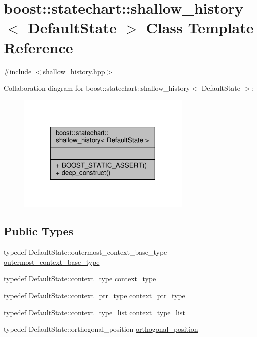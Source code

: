\hypertarget{classboost_1_1statechart_1_1shallow__history}{}\section{boost\+:\+:statechart\+:\+:shallow\+\_\+history$<$ Default\+State $>$ Class Template Reference}
\label{classboost_1_1statechart_1_1shallow__history}


{\ttfamily \#include $<$shallow\+\_\+history.\+hpp$>$}



Collaboration diagram for boost\+:\+:statechart\+:\+:shallow\+\_\+history$<$ Default\+State $>$\+:
\nopagebreak
\begin{figure}[H]
\begin{center}
\leavevmode
\includegraphics[width=237pt]{classboost_1_1statechart_1_1shallow__history__coll__graph}
\end{center}
\end{figure}
\subsection*{Public Types}
\begin{DoxyCompactItemize}
\item 
typedef Default\+State\+::outermost\+\_\+context\+\_\+base\+\_\+type \mbox{\hyperlink{classboost_1_1statechart_1_1shallow__history_a26036d97ce8fe35752f8397c63673f21}{outermost\+\_\+context\+\_\+base\+\_\+type}}
\item 
typedef Default\+State\+::context\+\_\+type \mbox{\hyperlink{classboost_1_1statechart_1_1shallow__history_a885e2d2016c3a49dd92ae38a116a740d}{context\+\_\+type}}
\item 
typedef Default\+State\+::context\+\_\+ptr\+\_\+type \mbox{\hyperlink{classboost_1_1statechart_1_1shallow__history_a6433a73f2c4b7e7c42e2e2618c0ff784}{context\+\_\+ptr\+\_\+type}}
\item 
typedef Default\+State\+::context\+\_\+type\+\_\+list \mbox{\hyperlink{classboost_1_1statechart_1_1shallow__history_ad23605c8ea236812cad331de5ae97632}{context\+\_\+type\+\_\+list}}
\item 
typedef Default\+State\+::orthogonal\+\_\+position \mbox{\hyperlink{classboost_1_1statechart_1_1shallow__history_ad8dd479f4274f346d065554c0a60610a}{orthogonal\+\_\+position}}
\end{DoxyCompactItemize}
